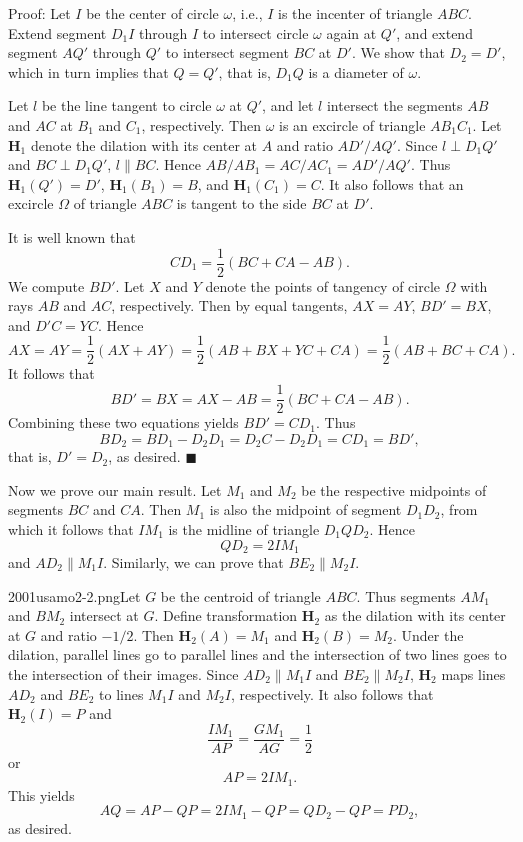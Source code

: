 \begin{enumerate}
 Proof: Let $I$ be the center of circle $\omega$, i.e., $I$ is the incenter of triangle $ABC$. Extend segment $D_1I$ through $I$ to intersect circle $\omega$ again at $Q'$, and extend segment $AQ'$ through $Q'$ to intersect segment $BC$ at $D'$. We show that $D_2 = D'$, which in turn implies that $Q = Q'$, that is, $D_1Q$ is a diameter of $\omega$.

 Let $l$ be the line tangent to circle $\omega$ at $Q'$, and let $l$ intersect the segments $AB$ and $AC$ at $B_1$ and $C_1$, respectively. Then $\omega$ is an excircle of triangle $AB_1C_1$. Let $\mathbf{H}_1$ denote the dilation with its center at $A$ and ratio $AD'/AQ'$. Since $l\perp D_1Q'$ and $BC\perp D_1Q'$, $l\parallel BC$. Hence $AB/AB_1 = AC/AC_1 = AD'/AQ'$. Thus $\mathbf{H}_1(Q') = D'$, $\mathbf{H}_1(B_1) = B$, and $\mathbf{H}_1(C_1) = C$. It also follows that an excircle $\Omega$ of triangle $ABC$ is tangent to the side $BC$ at $D'$.

 It is well known that 
 \[CD_1 = \frac{1}{2}(BC + CA - AB).\] We compute $BD'$. Let $X$ and $Y$ denote the points of tangency of circle $\Omega$ with rays $AB$ and $AC$, respectively. Then by equal tangents, $AX = AY$, $BD' = BX$, and $D'C = YC$. Hence 
 \[AX = AY = \frac{1}{2}(AX + AY) = \frac{1}{2}(AB + BX + YC + CA) = \frac{1}{2}(AB + BC + CA).\] It follows that 
 \[BD' = BX = AX - AB = \frac{1}{2}(BC + CA - AB).\] Combining these two equations yields $BD' = CD_1$. Thus 
 \[BD_2 = BD_1 - D_2D_1 = D_2C - D_2D_1 = CD_1 = BD',\] that is, $D' = D_2$, as desired. $\blacksquare$

 Now we prove our main result. Let $M_1$ and $M_2$ be the respective midpoints of segments $BC$ and $CA$. Then $M_1$ is also the midpoint of segment $D_1D_2$, from which it follows that $IM_1$ is the midline of triangle $D_1QD_2$. Hence 
 \[QD_2 = 2IM_1\] and $AD_2\parallel M_1I$. Similarly, we can prove that $BE_2\parallel M_2I$.

 2001usamo2-2.pngLet $G$ be the centroid of triangle $ABC$. Thus segments $AM_1$ and $BM_2$ intersect at $G$. Define transformation $\mathbf{H}_2$ as the dilation with its center at $G$ and ratio $-1/2$. Then $\mathbf{H}_2(A) = M_1$ and $\mathbf{H}_2(B) = M_2$. Under the dilation, parallel lines go to parallel lines and the intersection of two lines goes to the intersection of their images. Since $AD_2\parallel M_1I$ and $BE_2\parallel M_2I$, $\mathbf{H}_2$ maps lines $AD_2$ and $BE_2$ to lines $M_1I$ and $M_2I$, respectively. It also follows that $\mathbf{H}_2(I) = P$ and 
 \[\frac{IM_1}{AP} = \frac{GM_1}{AG} = \frac{1}{2}\] or 
 \[AP = 2IM_1.\] This yields 
 \[AQ = AP - QP = 2IM_1 - QP = QD_2 - QP = PD_2,\] as desired.


\end{enumerate}
